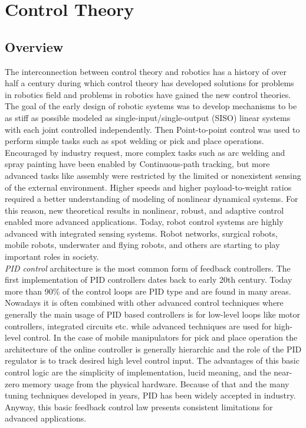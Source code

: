 
\chapter{Control Theory}
\label{chapter3}
\section{Overview}
The interconnection between control theory and robotics has a history of over half a century during which control theory has developed solutions for problems in robotics field and problems in robotics have gained the new control theories. The goal of the early design of robotic systems was to develop mechanisms to be as stiff as possible modeled as single-input/single-output (SISO) linear systems with each joint controlled independently. Then Point-to-point control was used to perform simple tasks such as spot welding or pick and place operations. Encouraged by industry request, more complex tasks such as arc welding and spray painting have been enabled by Continuous-path tracking, but more advanced tasks like assembly were restricted by the limited or nonexistent sensing of the external environment. Higher speeds and higher payload-to-weight ratios required a better understanding of modeling of nonlinear dynamical systems. For this reason, new theoretical results in nonlinear, robust, and adaptive control enabled more advanced applications. Today, robot control systems are highly advanced with integrated sensing systems. Robot networks, surgical robots, mobile robots, underwater and flying robots, and others are starting to play important roles in society.\\
\textit{PID control} architecture is the most common form of feedback controllers. The first implementation of PID controllers dates back to early 20th century. Today more than 90\% of the control loops are PID type and are found in many areas. Nowadays it is often combined with other advanced control techniques where generally the main usage of PID based controllers is for low-level loops like motor controllers, integrated circuits etc. while advanced techniques are used for high-level control. In the case of mobile manipulators for pick and place operation the architecture of the online controller is generally hierarchic and the role of the PID regulator is to track desired high level control input.
The advantages of this basic control logic are the simplicity of implementation, lucid meaning, and the near-zero memory usage from the physical hardware. Because of that and the many tuning techniques developed in years, PID has been widely accepted in industry. Anyway, this basic feedback control law presents consistent limitations for advanced applications. 
